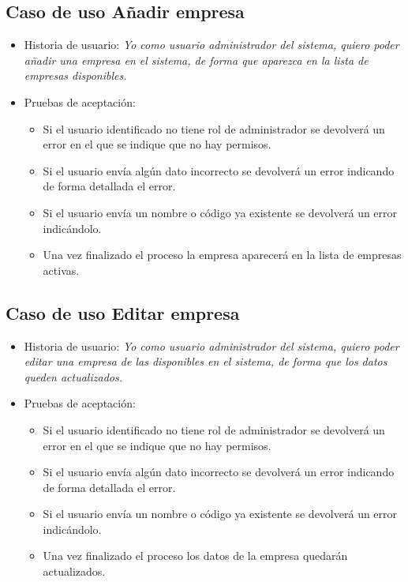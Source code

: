 \documentclass[12pt,a4paperpaper,]{report}
\providecommand{\tightlist}{%
  \setlength{\itemsep}{0pt}\setlength{\parskip}{0pt}}
\begin{document}
\subsection{Caso de uso Añadir
empresa}\label{caso-de-uso-auxf1adir-empresa-2}

\begin{itemize}
\tightlist
\item
  Historia de usuario: \emph{Yo como usuario administrador del sistema,
  quiero poder añadir una empresa en el sistema, de forma que aparezca
  en la lista de empresas disponibles.}
\item
  Pruebas de aceptación:

  \begin{itemize}
  \tightlist
  \item
    Si el usuario identificado no tiene rol de administrador se
    devolverá un error en el que se indique que no hay permisos.
  \item
    Si el usuario envía algún dato incorrecto se devolverá un error
    indicando de forma detallada el error.
  \item
    Si el usuario envía un nombre o código ya existente se devolverá un
    error indicándolo.
  \item
    Una vez finalizado el proceso la empresa aparecerá en la lista de
    empresas activas.
  \end{itemize}
\end{itemize}

\subsection{Caso de uso Editar
empresa}\label{caso-de-uso-editar-empresa-2}

\begin{itemize}
\tightlist
\item
  Historia de usuario: \emph{Yo como usuario administrador del sistema,
  quiero poder editar una empresa de las disponibles en el sistema, de
  forma que los datos queden actualizados.}
\item
  Pruebas de aceptación:

  \begin{itemize}
  \tightlist
  \item
    Si el usuario identificado no tiene rol de administrador se
    devolverá un error en el que se indique que no hay permisos.
  \item
    Si el usuario envía algún dato incorrecto se devolverá un error
    indicando de forma detallada el error.
  \item
    Si el usuario envía un nombre o código ya existente se devolverá un
    error indicándolo.
  \item
    Una vez finalizado el proceso los datos de la empresa quedarán
    actualizados.
  \end{itemize}
\end{itemize}
\end{document}
